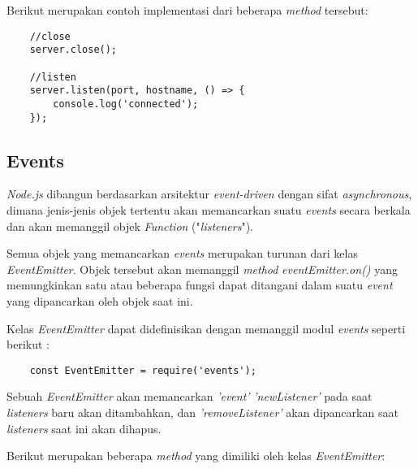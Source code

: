 Berikut merupakan contoh implementasi dari beberapa \textit{method} tersebut: 

\begin{lstlisting}
	//close
	server.close();
	
	//listen
	server.listen(port, hostname, () => {
		console.log('connected');
	});
\end{lstlisting}

\subsection{Events}
\textit{Node.js} dibangun berdasarkan arsitektur \textit{event-driven} dengan sifat \textit{asynchronous}, dimana jenis-jenis objek tertentu akan memancarkan suatu \textit{events} secara berkala dan akan memanggil objek \textit{Function} ("\textit{listeners}").

Semua objek yang memancarkan \textit{events} merupakan turunan dari kelas \textit{EventEmitter}. Objek tersebut akan memanggil \textit{method} \textit{eventEmitter.on()} yang memungkinkan satu atau beberapa fungsi dapat ditangani dalam suatu \textit{event} yang dipancarkan oleh objek saat ini.

Kelas \textit{EventEmitter} dapat didefinisikan dengan memanggil modul \textit{events} seperti berikut :

\begin{lstlisting}
	const EventEmitter = require('events');
\end{lstlisting}

Sebuah \textit{EventEmitter} akan memancarkan \textit{'event'} \textit{'newListener'} pada saat \textit{listeners} baru akan ditambahkan, dan \textit{'removeListener'} akan dipancarkan saat \textit{listeners} saat ini akan dihapus.

Berikut merupakan beberapa \textit{method} yang dimiliki oleh kelas \textit{EventEmitter}:

